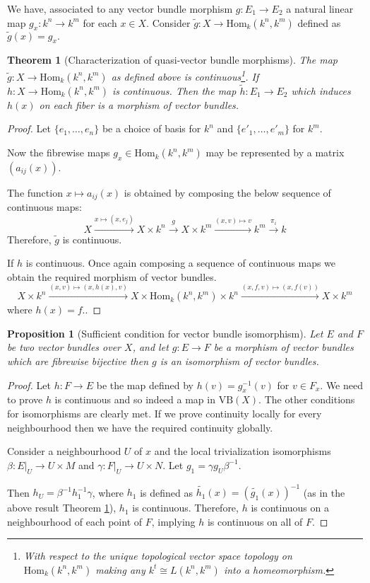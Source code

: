 \documentclass[12pt]{report}
\numberwithin{equation}{section}
\newcommand{\Hom}{{\mathrm{Hom}}}
\newtheorem{theorem}[dummy]{Theorem}
\newtheorem{proposition}[dummy]{Proposition}
\begin{document}
	We have, associated to any vector bundle morphism $g: E_1 \to E_2$ a natural linear map $g_x: k^n \to k^m$ for each \(x \in X\). Consider $\widetilde{g}: X \to \Hom_k(k^n, k^m)$ defined as $\widetilde{g}(x)=g_x.$
	\begin{theorem}[Characterization of quasi-vector bundle morphisms]\label{thtrivialbundlemorphisms}
		The map $\tilde{g}: X \to \text{Hom}_k(k^n, k^m)$ as defined above is continuous\footnote{With respect to the unique topological vector space topology on $\text{Hom}_k(k^n, k^m)$ making any $k^t \cong L(k^n,k^m)$ into a homeomorphism.}. If ${h}: X \to \text{Hom}_k(k^n, k^m)$ is continuous. Then the map $\tilde{h}: E_1 \to E_2$ which induces $h(x)$ on each fiber is a morphism of vector bundles.
	\end{theorem}
	\begin{proof}
		Let $\{e_1, \dots, e_n\}$ be a choice of basis for $k^n$ and $\{e'_1, \dots, e'_m\}$ for $k^m$.  
		
		Now the fibrewise maps ${g}_x \in \text{Hom}_k(k^n, k^m)$ may be represented by a matrix $(a_{ij}(x))$.
		
		The function $x \mapsto a_{ij}(x)$ is obtained by composing the below sequence of continuous maps:
		\[ X \xrightarrow{x \mapsto (x,e_j)} X \times k^n \xrightarrow{g} X \times k^m \xrightarrow{(x,v)\mapsto v} k^m \xrightarrow{\pi_i} k \]
		Therefore, $\tilde{g}$ is continuous.
		
		If $h$ is continuous. Once again composing a sequence of continuous maps we obtain the required morphism of vector bundles.
		\[ X \times k^n \xrightarrow{(x,v)\mapsto (x,h(x),v)} X \times \text{Hom}_k(k^n, k^m) \times k^n \xrightarrow{(x,f,v)\mapsto (x,f(v))} X \times k^m \]
		where $h(x)=f.$.
	\end{proof}
	
	\begin{proposition}[Sufficient condition for vector bundle isomorphism]\label{propsciso}
		Let $E$ and $F$ be two vector bundles over $X$, and let $g: E \to F$ be a morphism of vector bundles which are fibrewise bijective then \(g\) is an isomorphism of vector bundles.
	\end{proposition}
	
	\begin{proof}
		Let $h: F\to E$ be the map defined by $h(v) = g_x^{-1}(v)$ for $v \in F_x$. We need to prove $h$ is continuous and so indeed a map in $\mathrm{VB}(X)$. The other conditions for isomorphisms are clearly met. If we prove continuity locally for every neighbourhood then we have the required continuity globally.
		
		Consider a neighbourhood $U$ of $x$ and the local trivialization isomorphisms $\beta: E|_U \to U \times M$ and $\gamma: F|_U \to U \times N$. Let $g_1 = \gamma g_U \beta^{-1}$. 
		
		Then $h_U = \beta^{-1} h_1^{-1} \gamma$, where $h_1$ is defined as $\widetilde{h_1}(x) = (\widetilde{g_1}(x))^{-1}$ (as in the above result Theorem \ref{thtrivialbundlemorphisms}), $h_1$ is continuous.  Therefore, $h$ is continuous on a neighbourhood of each point of $F$, implying $h$ is continuous on all of $F$.
	\end{proof}
	
\end{document}
